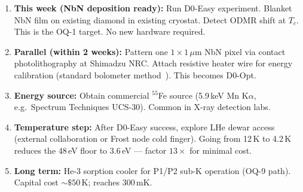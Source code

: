 \begin{enumerate}
  \item \textbf{This week (NbN deposition ready):} Run D0-Easy experiment.
    Blanket NbN film on existing diamond in existing cryostat. Detect ODMR shift at
    $T_c$. This is the OQ-1 target. No new hardware required.

  \item \textbf{Parallel (within 2 weeks):} Pattern one $1 \times 1\,\mu$m
    NbN pixel via contact photolithography at Shimadzu NRC. Attach resistive heater
    wire for energy calibration (standard bolometer method~\cite{Richards1994}).
    This becomes D0-Opt.

  \item \textbf{Energy source:} Obtain commercial $^{55}$Fe source (5.9\,keV Mn
    K$\alpha$, e.g.\ Spectrum Techniques UCS-30). Common in X-ray detection labs.

  \item \textbf{Temperature step:} After D0-Easy success, explore LHe dewar access
    (external collaboration or Frost node cold finger). Going from 12\,K to 4.2\,K
    reduces the 48\,eV floor to 3.6\,eV --- factor $13\times$ for minimal cost.

  \item \textbf{Long term:} He-3 sorption cooler for P1/P2 sub-K operation (OQ-9
    path). Capital cost $\sim\!\$50$\,K; reaches 300\,mK.
\end{enumerate}
